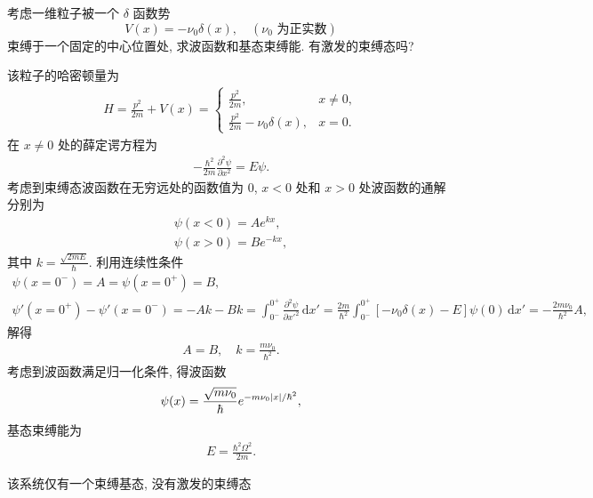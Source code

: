 \documentclass{assignment}
\begin{document}
\begin{prob}[课本习题 2.24]
    考虑一维粒子被一个 $\delta$ 函数势
    \[
        V(x)=-\nu_0\delta(x),\quad(\nu_0\text{ 为正实数})
    \]
    束缚于一个固定的中心位置处, 求波函数和基态束缚能. 有激发的束缚态吗?
\end{prob}
\begin{prob}
    该粒子的哈密顿量为
    \begin{align}
        H=\frac{p^2}{2m}+V(x)=\left\{\begin{array}{ll}
            \frac{p^2}{2m},&x\neq 0,\\
            \frac{p^2}{2m}-\nu_0\delta(x),&x=0.
        \end{array}\right.
    \end{align}
    在 $x\neq 0$ 处的薛定谔方程为
    \begin{align}
        -\frac{\hbar^2}{2m}\frac{\partial^2\psi}{\partial x^2}=E\psi.
    \end{align}
    考虑到束缚态波函数在无穷远处的函数值为 $0$, $x<0$ 处和 $x>0$ 处波函数的通解分别为
    \begin{align}
        \psi(x<0)=Ae^{kx},\\
        \psi(x>0)=Be^{-kx},
    \end{align}
    其中 $k=\frac{\sqrt{2mE}}{\hbar}$.
    利用连续性条件
    \begin{gather}
        \psi(x=0^-)=A=\psi(x=0^+)=B,\\
        \psi'(x=0^+)-\psi'(x=0^-)=-Ak-Bk=\int_{0^-}^{0^+}\frac{\partial^2\psi}{\partial x'^2}\,\mathrm{d}x'=\frac{2m}{\hbar^2}\int_{0^-}^{0^+}[-\nu_0\delta(x)-E]\psi(0)\,\mathrm{d}x'=-\frac{2m\nu_0}{\hbar^2}A,
    \end{gather}
    解得
    \begin{align}
        A=B,\quad k=\frac{m\nu_0}{\hbar^2}.
    \end{align}
    考虑到波函数满足归一化条件, 得波函数
    \begin{align}
        \psi(x)=\frac{\sqrt{m\nu_0}}{\hbar}e^{-m\nu_0\left\lvert x\right\rvert/\hbar^2},
    \end{align}
    基态束缚能为
    \begin{align}
        E=\frac{\hbar^2\Omega^2}{2m}.
    \end{align}

    该系统仅有一个束缚基态, 没有激发的束缚态
\end{prob}
\end{document}
